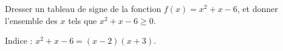 
\begin{exercice}\label{exoPremiere-0063}

Dresser un tableau de signe de la fonction \( f(x)=x^2+x-6\), et donner l'ensemble des \( x\) tels que \( x^2+x-6\geq 0\).

Indice : \( x^2+x-6=(x-2)(x+3)\).

\end{exercice}
